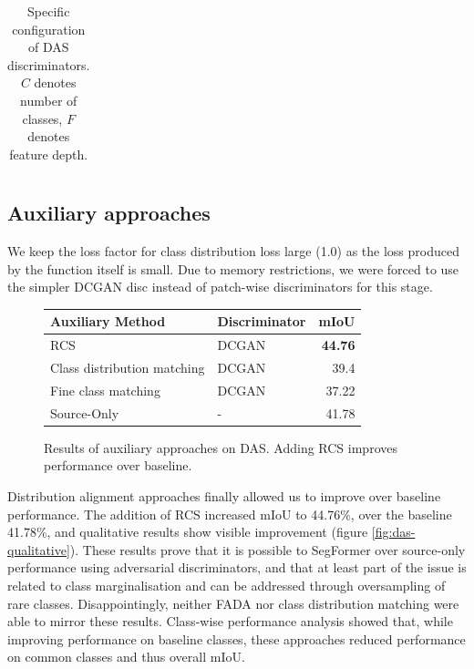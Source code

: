 \documentclass[a4paper,12pt]{report}
\begin{document}
\begin{table}[]
{\begin{tabular}{|l|l|}
        \end{tabular}
    }
    \caption{Specific configuration of DAS discriminators. $C$ denotes number of classes, $F$ denotes feature depth.}
    \label{tab:das-disc-configurations}
\end{table}

\subsection{Auxiliary approaches}
We keep the loss factor for class distribution loss large (1.0) as the loss produced by the function itself is small. Due to memory restrictions, we were forced to use the simpler DCGAN disc instead of patch-wise discriminators for this stage.

\begin{figure}[h]
    \centering
    \begin{tabular}{|l|l|r|}
        \hline
        Auxiliary Method            & Discriminator & \multicolumn{1}{l|}{mIoU} \\ \hline
        RCS                         & DCGAN         & \textbf{44.76}            \\ \hline
        Class distribution matching & DCGAN         & 39.4                      \\ \hline
        Fine class matching         & DCGAN         & 37.22                     \\ \hline
        Source-Only                 & -             & 41.78                     \\ \hline
    \end{tabular}
    \caption{Results of auxiliary approaches on DAS. Adding RCS improves performance over baseline.}
\end{figure}

Distribution alignment approaches finally allowed us to improve over baseline performance. The addition of RCS increased mIoU to 44.76\%, over the baseline 41.78\%, and qualitative results show visible improvement (figure \ref{fig:das-qualitative}). These results prove that it is possible to SegFormer over source-only performance using adversarial discriminators, and that at least part of the issue is related to class marginalisation and can be addressed through oversampling of rare classes. Disappointingly, neither FADA nor class distribution matching were able to mirror these results. Class-wise performance analysis showed that, while improving performance on baseline classes, these approaches reduced performance on common classes and thus overall mIoU.
\end{document}
